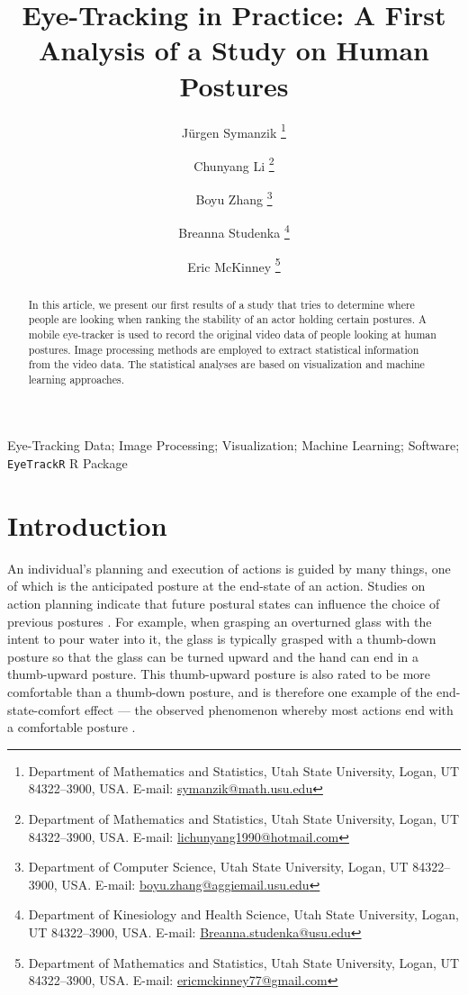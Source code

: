 \documentclass[11pt]{asaproc}
\title{Eye-Tracking in Practice: A First Analysis of a Study on Human Postures}
\author{J\"{u}rgen Symanzik \thanks{Department of Mathematics and Statistics, Utah State University, Logan, UT 84322--3900, USA. 
E-mail: \url{symanzik@math.usu.edu}}
 \and Chunyang Li \thanks{Department of Mathematics and Statistics, Utah State University, Logan, UT 84322--3900, USA. 
E-mail: \url{lichunyang1990@hotmail.com}}
 \and Boyu Zhang \thanks{Department of Computer Science, Utah State University, Logan, UT 84322--3900, USA. 
E-mail: \url{boyu.zhang@aggiemail.usu.edu}}
 \and Breanna Studenka \thanks{Department of Kinesiology and Health Science, Utah State University, Logan, UT 84322--3900, USA. 
E-mail: \url{Breanna.studenka@usu.edu}}
 \and Eric McKinney \thanks{Department of Mathematics and Statistics, Utah State University, Logan, UT 84322--3900, USA. 
E-mail: \url{ericmckinney77@gmail.com}}
}
\begin{document}
\renewcommand{\topfraction}{1.0}
\renewcommand{\bottomfraction}{1.0}
\renewcommand{\textfraction}{0.0}
\renewcommand{\floatpagefraction}{1.0}
\renewcommand{\dbltopfraction}{1.0}


\maketitle

\begin{abstract}In this article, we present our first results of a study that tries to determine where people are looking when ranking the stability of an
actor holding certain postures. A mobile eye-tracker is used to record the original video data of people looking at human
postures. Image processing methods are employed to extract statistical information from the video data. 
The statistical analyses are based on visualization and machine learning approaches.
\end{abstract}

\begin{keywords}Eye-Tracking Data; Image Processing; Visualization; Machine Learning; Software; {\tt EyeTrackR} R Package
\end{keywords}


\section{Introduction}
\label{Introduction}

An individual's planning and execution of actions is guided by many things, one of which is the anticipated posture at the end-state of an action. Studies on action planning indicate that future postural states can influence the choice of previous postures 
\citep{CR2004,HB2010,RCMV2006}.
For example, when grasping an overturned glass with the intent to pour water into it, the glass is typically grasped with a thumb-down posture so that the glass can be turned upward and the hand can end in a thumb-upward posture. This thumb-upward posture is also rated to be more comfortable than a thumb-down posture, and is therefore one example of the end-state-comfort effect --- the observed phenomenon whereby most actions end with a comfortable posture
\citep{RMBVSJ1990}.

\end{document}
